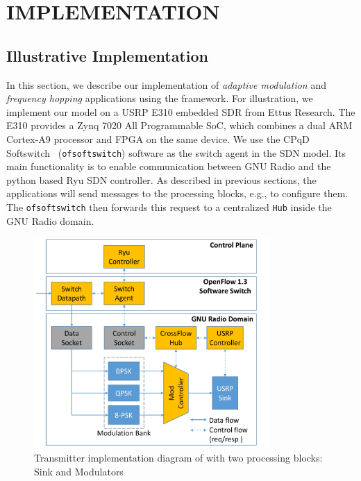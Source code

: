 \chapter{\uppercase {\crossflow Implementation}}
\label{sec:evaluation}

\section{Illustrative \crossflow Implementation}

In this section, we describe our implementation of \emph{adaptive modulation} and \emph{frequency hopping} applications using the \crossflow framework. For illustration, we implement our model on a USRP E310 embedded SDR from Ettus Research. The E310 provides a Zynq 7020 All Programmable SoC, which combines a dual ARM Cortex-A9 processor and FPGA on the same device. We use the CPqD Softswitch~\cite{ofsoftswitch13} (\texttt{ofsoftswitch}) software as the switch agent in the SDN model. Its main functionality is to enable communication between GNU Radio and the python based Ryu SDN controller. As described in previous sections, the applications will send messages to the processing blocks, e.g., to configure them. The \texttt{ofsoftswitch} then forwards this request to a centralized \texttt{\crossflow Hub} inside the GNU Radio domain. 

\begin{figure}[t]
  \centering
  \includegraphics[width=0.8\textwidth]{figures/Flowgraph.pdf}
  \caption{Transmitter implementation diagram of \crossflow with two processing blocks: Sink and Modulators}
  \label{fig:flowgraph}
\end{figure}

